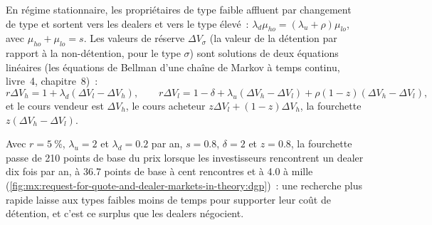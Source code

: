 En régime stationnaire, les propriétaires de type faible affluent par changement de type et sortent vers les dealers et vers le type élevé~: $\lambda_d\mu_{ho}=(\lambda_u+\rho)\mu_{lo}$,
avec $\mu_{ho}+\mu_{lo}=s$. Les valeurs de réserve $\Delta V_\sigma$ (la valeur de la détention par rapport à la non-détention, pour le type $\sigma$) sont solutions de deux équations
linéaires (les équations de Bellman d'une chaîne de Markov à temps continu, livre~4, chapitre~8)~:
\[
r\Delta V_h=1+\lambda_d(\Delta V_l-\Delta V_h),\qquad r\Delta V_l=1-\delta+\lambda_u(\Delta V_h-\Delta V_l)+\rho(1-z)(\Delta V_h-\Delta V_l),
\]
et le cours vendeur est $\Delta V_h$, le cours acheteur $z\Delta V_l+(1-z)\Delta V_h$, la fourchette $z(\Delta V_h-\Delta V_l)$.

\label{lst:mx:request-for-quote-and-dealer-markets-in-theory:dgp}

Avec $r=5~\%$, $\lambda_u=2$ et $\lambda_d=0.2$ par an, $s=0.8$, $\delta=2$ et $z=0.8$, la fourchette passe de 210 points de base du prix lorsque
les investisseurs rencontrent un dealer dix fois par an, à 36.7 points de base à cent rencontres et à 4.0 à mille (\cref{fig:mx:request-for-quote-and-dealer-markets-in-theory:dgp})~:
une recherche plus rapide laisse aux types faibles moins de temps pour supporter leur coût de détention, et c'est ce surplus que les dealers négocient.

\begin{omfigure}

\label{fig:mx:request-for-quote-and-dealer-markets-in-theory:dgp}
\end{omfigure}

